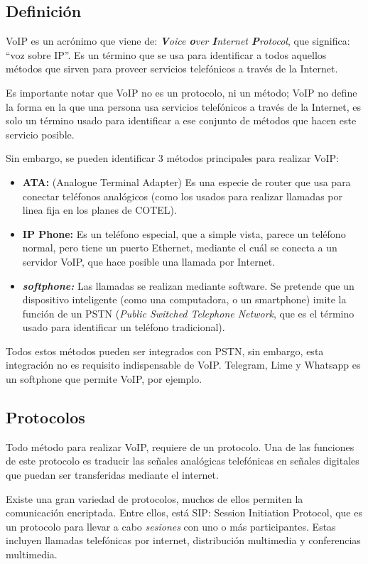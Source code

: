 \subsection{Definición}
VoIP es un acrónimo que viene de: \textit{\textbf{V}oice \textbf{o}ver \textbf{I}nternet \textbf{P}rotocol}, que significa: ``voz sobre IP''. Es un término que se usa para identificar a todos aquellos métodos que sirven para proveer servicios telefónicos a través de la Internet.\cite{voip:whatis}

Es importante notar que VoIP no es un protocolo, ni un método; VoIP no define la forma en la que una persona usa servicios telefónicos a través de la Internet, es solo un término usado para identificar a ese conjunto de métodos que hacen este servicio posible.\cite{voip:rfc}

Sin embargo, se pueden identificar 3 métodos principales para realizar VoIP:

\begin{itemize}
\item \textbf{ATA:} (Analogue Terminal Adapter) Es una especie de router que usa para conectar teléfonos analógicos (como los usados para realizar llamadas por linea fija en los planes de COTEL).\cite{voip:ata}
\item \textbf{IP Phone:} Es un teléfono especial, que a simple vista, parece un teléfono normal, pero tiene un puerto Ethernet, mediante el cuál se conecta a un servidor VoIP, que hace posible una llamada por Internet.
\item \textbf{\textit{softphone:}} Las llamadas se realizan mediante software. Se pretende que un dispositivo inteligente (como una computadora, o un smartphone) imite la función de un PSTN (\textit{Public Switched Telephone Network}, que es el término usado para identificar un teléfono tradicional).
\end{itemize}

Todos estos métodos pueden ser integrados con PSTN, sin embargo, esta integración no es requisito indispensable de VoIP. Telegram, Lime y Whatsapp es un softphone que permite VoIP, por ejemplo. 

\subsection{Protocolos}

Todo método para realizar VoIP, requiere de un protocolo. Una de las funciones de este protocolo es traducir las señales analógicas telefónicas en señales digitales que puedan ser transferidas mediante el internet.

Existe una gran variedad de protocolos, muchos de ellos permiten la comunicación encriptada. Entre ellos, está SIP: Session Initiation Protocol, que es un protocolo para llevar a cabo \textit{sesiones} con uno o más participantes. Estas incluyen llamadas telefónicas por internet, distribución multimedia y conferencias multimedia.\cite{rfc:sip}


